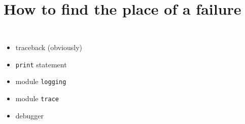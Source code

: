 \documentclass[14pt,notes,svgnames,aspectratio=169]{beamer}
\begin{document}
\begingroup
    \section{How to find the place of a failure}
\endgroup

\begin{frame}
    \begin{columns}
        \begin{itemize}[<+->]
            \item<1,2,3,4,5> traceback (obviously)
            \item<2,3,4,5> \lstinline{print} statement
            \item<3,4,5> module \lstinline{logging}
            \item<4,5> module \lstinline{trace}
            \item<5> debugger
        \end{itemize}
        \centering
\end{columns}
\end{frame}
\end{document}
